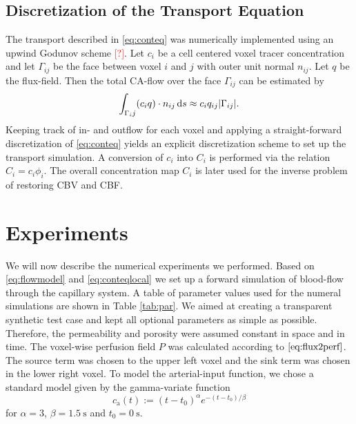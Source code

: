 \documentclass[paper=a4, fontsize=11pt,parskip=half,headings=small]{scrartcl}
\newcommand{\ca}{c_\mathrm{a}}
\newcommand{\missingsource}{\textcolor{red}{[?]}}
\begin{document}
	\subsection{Discretization of the Transport Equation} \label{sec:numtrans}
	The transport described in \eqref{eq:conteq} was numerically implemented using an upwind Godunov scheme \missingsource.
	Let $c_i$ be a cell centered voxel tracer concentration and let $\Gamma_{ij}$ be the face between voxel $i$ and $j$ with outer unit normal $n_{ij}$.
	Let $q$ be the flux-field. 
	Then the total CA-flow over the face $\Gamma_{ij}$ can be estimated by
	\[
		\int_{\Gamma_ij} (c_i q)\cdot n_{ij} \,\mathrm{d} s \approx c_i q_{ij} \vert \Gamma_{ij} \vert.
	\]
	Keeping track of in- and outflow for each voxel and applying a straight-forward discretization of \eqref{eq:conteq} yields an explicit discretization scheme to set up the transport simulation.
	A conversion of $c_i$ into $C_i$ is performed via the relation $C_i = c_i\phi_i$. 
	The overall concentration map $C_i$ is later used for the inverse problem of restoring CBV and CBF.





	\section{Experiments}\label{sec:NumExp}

	We will now describe the numerical experiments we performed.
	Based on \eqref{eq:flowmodel} and \eqref{eq:conteqlocal} we set up a forward simulation of blood-flow through the capillary system.
	A table of parameter values used for the numeral simulations are shown in Table \ref{tab:par}. 
	We aimed at creating a transparent synthetic test case and kept all optional parameters as simple as possible. 
	Therefore, the permeability and porosity were assumed constant in space and in time.
	The voxel-wise perfusion field $P$ was calculated according to $\eqref{eq:flux2perf}$. 
	The source term was chosen to the upper left voxel and the sink term was chosen in the lower right voxel.
	To model the arterial-input function, we chose a standard model \cite{ostergaard96} given by the gamma-variate \cite{chan04} function
	\[
		\ca(t) := (t-t_0)^\alpha e^{-(t-t_0)/\beta}
	\]
	for $\alpha=3$, $\beta = \SI{1.5}{\second}$ and $t_0 = \SI{0}{\second}$.
	
\end{document}
